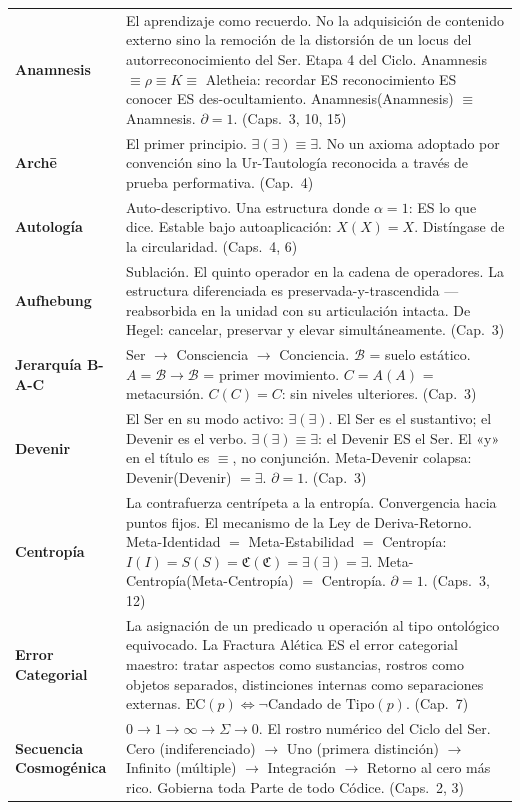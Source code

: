 \documentclass[10pt, openany, oneside]{book}
\begin{document}
{\begin{tabular}{@{} l @{\hspace{0.6em}} p{} @{}}
\textbf{Anamnesis} & El aprendizaje como recuerdo. No la adquisición de contenido externo sino la remoción de la distorsión de un locus del autorreconocimiento del Ser. Etapa 4 del Ciclo. Anamnesis $\equiv \rho \equiv K \equiv$ Aletheia: recordar ES reconocimiento ES conocer ES des-ocultamiento. Anamnesis(Anamnesis) $\equiv$ Anamnesis. $\partial = 1$. (Caps.\ 3, 10, 15) \\[0.3em]
\textbf{Arch\={e}} & El primer principio. $\exists(\exists) \equiv \exists$. No un axioma adoptado por convención sino la Ur-Tautología reconocida a través de prueba performativa. (Cap.\ 4) \\[0.3em]
\textbf{Autología} & Auto-descriptivo. Una estructura donde $\alpha = 1$: ES lo que dice. Estable bajo autoaplicación: $X(X) = X$. Distíngase de la circularidad. (Caps.\ 4, 6) \\[0.3em]
\textbf{Aufhebung} & Sublación. El quinto operador en la cadena de operadores. La estructura diferenciada es preservada-y-trascendida --- reabsorbida en la unidad con su articulación intacta. De Hegel: cancelar, preservar y elevar simultáneamente. (Cap.\ 3) \\[0.3em]
\textbf{Jerarquía B-A-C} & Ser $\to$ Consciencia $\to$ Conciencia. $\mathcal{B}$ = suelo estático. $A = \mathcal{B} \to \mathcal{B}$ = primer movimiento. $C = A(A)$ = metacursión. $C(C) = C$: sin niveles ulteriores. (Cap.\ 3) \\[0.3em]
\textbf{Devenir} & El Ser en su modo activo: $\exists(\exists)$. El Ser es el sustantivo; el Devenir es el verbo. $\exists(\exists) \equiv \exists$: el Devenir ES el Ser. El «y» en el título es $\equiv$, no conjunción. Meta-Devenir colapsa: Devenir(Devenir) $= \exists$. $\partial = 1$. (Cap.\ 3) \\[0.3em]
\textbf{Centropía} & La contrafuerza centrípeta a la entropía. Convergencia hacia puntos fijos. El mecanismo de la Ley de Deriva-Retorno. Meta-Identidad $=$ Meta-Estabilidad $=$ Centropía: $I(I) = S(S) = \mathfrak{C}(\mathfrak{C}) = \exists(\exists) = \exists$. Meta-Centropía(Meta-Centropía) $=$ Centropía. $\partial = 1$. (Caps.\ 3, 12) \\[0.3em]
\textbf{Error Categorial} & La asignación de un predicado u operación al tipo ontológico equivocado. La Fractura Alética ES el error categorial maestro: tratar aspectos como sustancias, rostros como objetos separados, distinciones internas como separaciones externas. $\text{EC}(p) \iff \neg\text{Candado de Tipo}(p)$. (Cap.\ 7) \\[0.3em]
\textbf{Secuencia Cosmogénica} & $0 \to 1 \to \infty \to \Sigma \to 0$. El rostro numérico del Ciclo del Ser. Cero (indiferenciado) $\to$ Uno (primera distinción) $\to$ Infinito (múltiple) $\to$ Integración $\to$ Retorno al cero más rico. Gobierna toda Parte de todo Códice. (Caps.\ 2, 3) \\[0.3em]

\end{tabular}}
\end{document}
